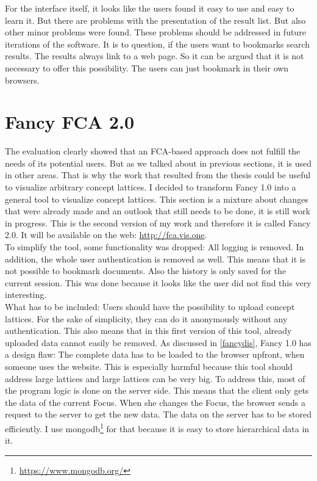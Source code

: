 \documentclass[11pt]{report}
\begin{document}
For the interface itself, it looks like the users found it easy to use and easy to learn it. But there are problems with the presentation of the result list. But also other minor problems were found. These problems should be addressed in future iterations of the software. It is to question, if the users want to bookmarks search results. The results always link to a web page. So it can be argued that it is not necessary to offer this possibility. The users can just bookmark in their own browsers.

\chapter{Fancy FCA 2.0}
\label{Fancy 2.0}

The evaluation clearly showed that an FCA-based approach does not fulfill the needs of its potential users. But as we talked about in previous sections, it is used in other areas. That is why the work that resulted from the thesis could be useful to visualize arbitrary concept lattices. I decided to transform Fancy 1.0 into a general tool to visualize concept lattices. This section is a mixture about changes that were already made and an outlook that still needs to be done, it is still work in progress. This is the second version of my work and therefore it is called Fancy 2.0. It will be available on the web: \url{http://fca.vis.one}.\\

To simplify the tool, some functionality was dropped: All logging is removed. In addition, the whole user authentication is removed as well. This means that it is not possible to bookmark documents. Also the history is only saved for the current \gls{session}. This was done because it looks like the user did not find this very interesting.\\

What has to be included: Users should have the possibility to upload concept lattices. For the sake of simplicity, they can do it anonymously without any authentication. This also means that in this first version of this tool, already uploaded data cannot easily be removed. As discussed in \ref{fancydis}, Fancy 1.0 has a design flaw: The complete data has to be loaded to the browser upfront, when someone uses the website. This is especially harmful because this tool should address large lattices and large lattices can be very big. To address this, most of the program logic is done on the server side. This means that the client only gets the data of the current Focus. When she changes the Focus, the browser sends a request to the server to get the new data. The data on the server has to be stored efficiently. I use mongodb\footnote{\url{https://www.mongodb.org/}} for that because it is easy to store hierarchical data in it.
\end{document}

